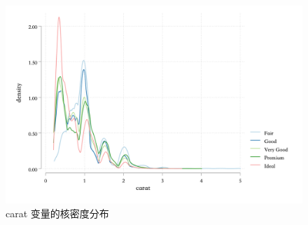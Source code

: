 \begin{figure}[htbp]
  \centering
  \includegraphics[width=\textwidth]{assets/kdensitycarat.png}
  \caption{carat 变量的核密度分布}
  \label{fig:kdensitycarat}
\end{figure}
